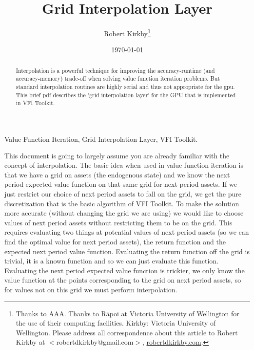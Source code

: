 \documentclass[11pt,fleqn]{article}
\begin{document}
\newcommand{\rob}[1]{{\noindent\color{blue}\bf #1}}
\newcommand{\robc}[1]{{\noindent\color{blue}\bf R: #1}}

\title{Grid Interpolation Layer}
\author{Robert Kirkby\thanks{Thanks to AAA. Thanks to R\={a}poi at Victoria University of Wellington for the use of their computing facilities. Kirkby: Victoria University of Wellington. Please address all correspondence about this article to Robert Kirkby at $<$robertdkirkby@gmail.com$>$,
\href{http://www.robertdkirkby.com}{robertdkirkby.com}.} }
\date{\today}
\maketitle

\begin{abstract}
Interpolation is a powerful technique for improving the accuracy-runtime (and accuracy-memory) trade-off when solving value function iteration problems. But standard interpolation routines are highly serial and thus not appropriate for the gpu. This brief pdf describes the 'grid interpolation layer' for the GPU that is implemented in VFI Toolkit.
\end{abstract}

 Value Function Iteration, Grid Interpolation Layer, VFI Toolkit.


\thispagestyle{empty}



\newpage
\baselineskip=17pt

This document is going to largely assume you are already familiar with the concept of interpolation. The basic idea when used in value function iteration is that we have a grid on assets (the endogenous state) and we know the next period expected value function on that same grid for next period assets. If we just restrict our choice of next period assets to fall on the grid, we get the pure discretization that is the basic algorithm of VFI Toolkit. To make the solution more accurate (without changing the grid we are using) we would like to choose values of next period assets without restricting them to be on the grid. This requires evaluating two things at potential values of next period assets (so we can find the optimal value for next period assets), the return function and the expected next period value function. Evaluating the return function off the grid is trivial, it is a known function and so we can just evaluate this function. Evaluating the next period expected value function is trickier, we only know the value function at the points corresponding to the grid on next period assets, so for values not on this grid we must perform interpolation.
\end{document}
